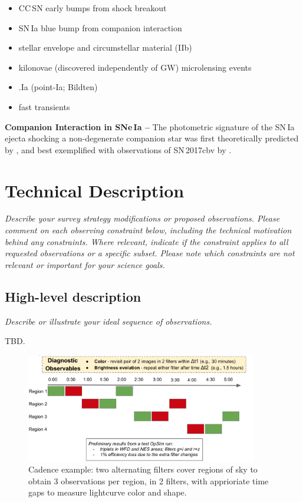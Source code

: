 \documentclass[11pt]{article}
\begin{document}
\begin{itemize}
    \item CC\,SN early bumps from shock breakout
    \item SN\,Ia blue bump from companion interaction
    \item stellar envelope and circumstellar material (IIb)
    \item kilonovae (discovered independently of GW)
    \iter microlensing events
    \item .Ia (point-Ia; Bildten)
    \item fast transients \citep{2014ApJ...794...23D}
\end{itemize}

{\bf Companion Interaction in SNe\,Ia --} The photometric signature of the SN\,Ia ejecta shocking a non-degenerate companion star was first theoretically predicted by \cite{2010ApJ...708.1025K}, and best exemplified with observations of SN\,2017cbv by \cite{2017ApJ...845L..11H}. 



\clearpage
\section{Technical Description}
\begin{footnotesize}
{\it Describe your survey strategy modifications or proposed observations. Please comment on each observing constraint below, including the technical motivation behind any constraints. Where relevant, indicate if the constraint applies to all requested observations or a specific subset. Please note which constraints are not relevant or important for your science goals.}
\end{footnotesize}

\subsection{High-level description}
\begin{footnotesize}
{\it Describe or illustrate your ideal sequence of observations.}
\end{footnotesize}

TBD.
\begin{figure}[!h]
\includegraphics[width=0.9\textwidth]{figures/highLevelCadence.png}
\caption{Cadence example: two alternating filters cover regions of sky to obtain 3 observations per region, in 2 filters, with apprioriate time gaps to measure lightcurve color and shape.}
\end{figure}
\end{document}
